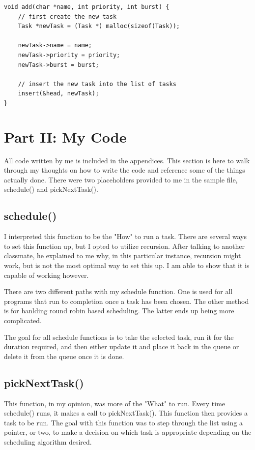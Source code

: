 \documentclass[10pt]{article}
\begin{document}
\begin{verbatim}
void add(char *name, int priority, int burst) {
    // first create the new task
    Task *newTask = (Task *) malloc(sizeof(Task));
    
    newTask->name = name;
    newTask->priority = priority;
    newTask->burst = burst;
	
    // insert the new task into the list of tasks 
    insert(&head, newTask);
}
\end{verbatim}
\section{Part II: My Code}
All code written by me is included in the appendices.  This section is here to walk through my thoughts on how to write the code and reference some of the things actually done.  There were two placeholders provided to me in the sample file, schedule() and pickNextTask().

\subsection{schedule()}
I interpreted this function to be the "How" to run a task.  There are several ways to set this function up, but I opted to utilize recursion.  After talking to another classmate, he explained to me why, in this particular instance, recursion might work, but is not the most optimal way to set this up.  I am able to show that it is capable of working however.  

There are two different paths with my schedule function.  One is used for all programs that run to completion once a task has been chosen.  The other method is for hanlding round robin based scheduling.  The latter ends up being more complicated.

The goal for all schedule functions is to take the selected task, run it for the duration required, and then either update it and place it back in the queue or delete it from the queue once it is done.

\subsection{pickNextTask()}
This function, in my opinion, was more of the "What" to run.  Every time schedule() runs, it makes a call to pickNextTask().  This function then provides a task to be run.  The goal with this function was to step through the list using a pointer, or two, to make a decision on which task is appropriate depending on the scheduling algorithm desired.
\end{document}

